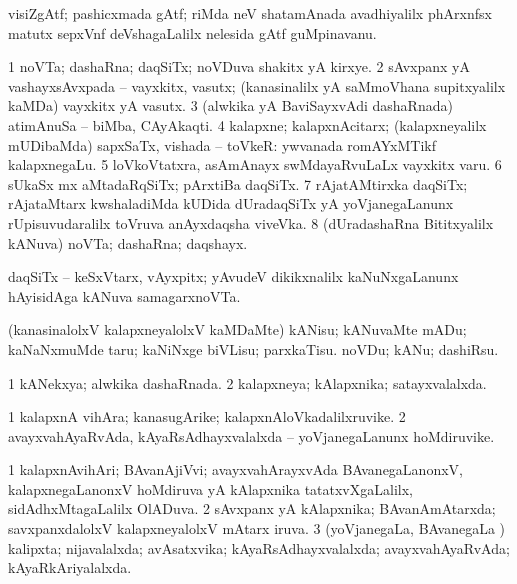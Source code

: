 \bentry 
{} 
\gl{\nA}
\expl{}
\bmng
 visiZgAtf; pashicxmada gAtf; riMda neV shatamAnada avadhiyalilx phArxnfsx matutx sepxVnf deVshagaLalilx nelesida gAtf guMpinavanu. 
\emng
\eentry

\bentry 
{} 
\gl{\nA}
\expl{}
\bmng
\bnum
\num{1} noVTa; dashaRna; daqSiTx; noVDuva shakitx yA kirxye. 
\num{2} sAvxpanx yA vashayxsAvxpada -- vayxkitx, vasutx; (kanasinalilx yA saMmoVhana supitxyalilx kaMDa) vayxkitx yA vasutx. 
\num{3} (alwkika yA BaviSayxvAdi dashaRnada) atimAnuSa -- biMba, CAyAkaqti. 
\num{4} kalapxne; kalapxnAcitarx; (kalapxneyalilx mUDibaMda) sapxSaTx, vishada -- toVkeR:  ywvanada romAYxMTikf kalapxnegaLu. 
\num{5} loVkoVtatxra, asAmAnayx swMdayaRvuLaLx vayxkitx \mo varu. 
\num{6} sUkaSx mx aMtadaRqSiTx; pArxtiBa daqSiTx. 
\num{7} rAjatAMtirxka daqSiTx; rAjataMtarx kwshaladiMda kUDida dUradaqSiTx yA yoVjanegaLanunx rUpisuvudaralilx toVruva anAyxdaqsha viveVka. 
\num{8} (dUradashaRna Bititxyalilx kANuva) noVTa; dashaRna; daqshayx. 
\enum
\emng

\noindent 
\gl{\pagu}
\expl{}
\bmng
  daqSiTx -- keSxVtarx, vAyxpitx; yAvudeV dikikxnalilx kaNuNxgaLanunx hAyisidAga kANuva samagarxnoVTa. 
\emng
\eentry

\bentry 
{} 
\gl{\sakirx}
\expl{}
\bmng
 (kanasinalolxV kalapxneyalolxV kaMDaMte) 
\banum
{} kANisu; kANuvaMte mADu; kaNaNxmuMde taru; kaNiNxge biVLisu; parxkaTisu. 
 noVDu; kANu; dashiRsu. 
\eanum
\emng
\eentry

\bentry
{} 
\gl{\gu}
\expl{}
\bmng
\bnum
\num{1} kANekxya; alwkika dashaRnada. 
\num{2} kalapxneya; kAlapxnika; satayxvalalxda. 
\enum
\emng
\eentry

\bentry 
{} 
\gl{\nA}
\expl{}
\bmng
\bnum
\num{1} kalapxnA vihAra; kanasugArike; kalapxnAloVkadalilxruvike. 
\num{2} avayxvahAyaRvAda, kAyaRsAdhayxvalalxda -- yoVjanegaLanunx hoMdiruvike. 
\enum
\emng
\eentry

\bentry 
{} 
\gl{\gu}
\expl{}
\bmng
\bnum
\num{1} kalapxnAvihAri; BAvanAjiVvi; avayxvahArayxvAda BAvanegaLanonxV, kalapxnegaLanonxV hoMdiruva yA kAlapxnika tatatxvXgaLalilx, sidAdhxMtagaLalilx OlADuva. 
\num{2} sAvxpanx yA kAlapxnika; BAvanAmAtarxda; savxpanxdalolxV kalapxneyalolxV mAtarx iruva. 
\num{3} (yoVjanegaLa, BAvanegaLa \vi) kalipxta; nijavalalxda; avAsatxvika; kAyaRsAdhayxvalalxda; avayxvahAyaRvAda; kAyaRkAriyalalxda. 
\enum
\emng
\eentry

